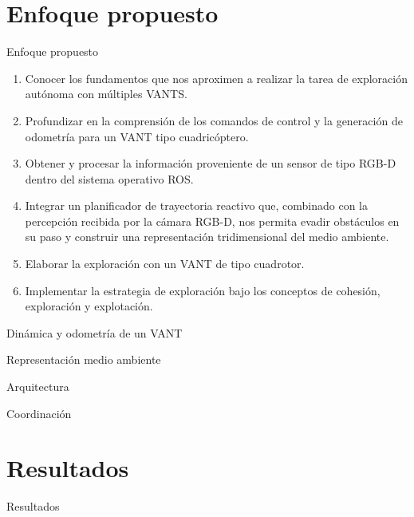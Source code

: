 \documentclass[
  24pt, %
  aspectratio=169, %
]{beamer}
\begin{document}
\section{Enfoque propuesto}
\begin{frame}{Enfoque propuesto}
  
  \begin{enumerate}
  \item Conocer los fundamentos que nos aproximen a realizar la tarea de exploración autónoma con múltiples VANTS.
  \item Profundizar en la comprensión de los comandos de control y la generación de odometría para un VANT tipo cuadricóptero.
  \item Obtener y procesar la información proveniente de un sensor de tipo RGB-D dentro del sistema operativo ROS.
  \item Integrar un planificador de trayectoria reactivo que, combinado con la percepción recibida por la cámara RGB-D, nos permita evadir obstáculos en su paso y construir una representación tridimensional del medio ambiente.
  \item Elaborar la exploración con un VANT de tipo cuadrotor.
  \item Implementar la estrategia de exploración bajo los conceptos de cohesión, exploración y explotación.
    
  \end{enumerate}
\end{frame}

\begin{frame}{Dinámica y odometría de un VANT}
\end{frame}

\begin{frame}{Representación medio ambiente}
\end{frame}

\begin{frame}{Arquitectura}
\end{frame}

\begin{frame}{Coordinación}
\end{frame}

\section{Resultados}
\begin{frame}{Resultados}
  \begin{figure}
    \centering
  \end{figure}
\end{frame}
\end{document}
